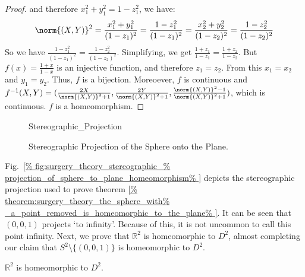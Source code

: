 \documentclass[crop=false,class=article,oneside]{standalone}
\begin{document}
\begin{proof}
            and therefore
            $x_{1}^{2}+y_{1}^{2}=1-z_{1}^{2}$, we have:
            \begin{equation*}
                \norm{(X,Y)}^{2}
                =\frac{x_{1}^2+y_{1}^2}{(1-z_{1})^{2}}
                =\frac{1-z_{1}^{2}}{(1-z_{1})^{2}}
                =\frac{x_{2}^{2}+y_{2}^{2}}{(1-z_{2})^{2}}
                =\frac{1-z_{2}^{2}}{(1-z_{2})^{2}}
            \end{equation*}
            So we have
            $\frac{1-z_{1}^{2}}{(1-z_{1})^{2}}%
             =\frac{1-z_{2}^{2}}{(1-z_{2})^{2}}$.
            Simplifying, we get
            $\frac{1+z_{1}}{1-z_{1}}=\frac{1+z_{2}}{1-z_{2}}$.
            But $f(x)=\frac{1+x}{1-x}$ is an injective function,
            and therefore $z_{1}=z_{2}$.
            From this $x_{1}=x_{2}$ and $y_{1}=y_{2}$.
            Thus, $f$ is a bijection. Moreoever,
            $f$ is continuous and $f^{-1}(X,Y)%
             =(\frac{2X}{\norm{(X,Y)}^{2}+1},%
               \frac{2Y}{\norm{(X,Y)}^{2}+1},%
               \frac{\norm{(X,Y)}^{2}-1}{\norm{(X,Y)}^{2}+1})$,
            which is continuous. $f$ is a homeomorphism.
        \end{proof}
        \begin{figure}[H]
            \captionsetup{type=figure}
            \centering
            {Stereographic_Projection}
            \caption{Stereographic Projection of the
                     Sphere onto the Plane.}
            \label{fig:surgery_theory_stereographic_%
                   projection_of_sphere_to_plane_homeomorphism}
        \end{figure}
        Fig.~\ref{%
            fig:surgery_theory_stereographic_%
            projection_of_sphere_to_plane_homeomorphism%
        }
        depicts the stereographic projection used
        to prove theorem
        \ref{%
            theorem:surgery_theory_the_sphere_with%
            _a_point_removed_is_homeomorphic_to_the_plane%
        }.
        It can be seen that $(0,0,1)$ projects `to infinity'.
        Because of this, it is not uncommon to call this point
        infinity. Next, we prove that $\mathbb{R}^{2}$ is
        homeomorphic to $D^{2}$, almost completing our claim
        that $S^{2}\setminus\{(0,0,1)\}$
        is homeomorphic to $D^{2}$.
        \begin{theorem}
            $\mathbb{R}^{2}$ is homeomorphic to $D^{2}$.
        \end{theorem}
\end{document}
